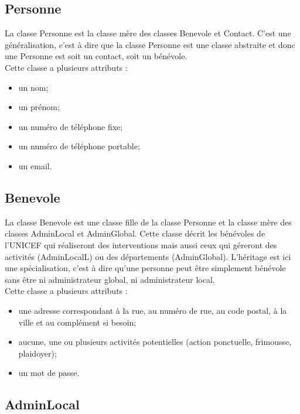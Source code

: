 \documentclass[asi, sansVersion]{picInsa}
\begin{document}
\subsection*{Personne}

La classe Personne est la classe mère des classes Benevole et Contact. C'est une généralisation, c'est à dire que la classe Personne est une classe abstraite et donc une Personne est soit un contact, soit un bénévole. \\
Cette classe a plusieurs attributs : 
\begin{itemize}
\item un nom; %
\item un prénom; %
\item un numéro de téléphone fixe; %
\item un numéro de téléphone portable; %
\item un email. %
\end{itemize}

\subsection*{Benevole}

La classe Benevole est une classe fille de la classe Personne et la classe mère des classes AdminLocal et AdminGlobal. Cette classe décrit les bénévoles de l'UNICEF qui réaliseront des interventions mais aussi ceux qui géreront des activités (AdminLocalL) ou des départements (AdminGlobal). L'héritage est ici une spécialisation, c'est à dire qu'une personne peut être simplement bénévole sans être ni administrateur global, ni administrateur local. \\
Cette classe a plusieurs attributs : 
\begin{itemize}
\item une adresse correspondant à la rue, au numéro de rue, au code postal, à la ville et au complément si besoin; %
\item aucune, une ou plusieurs activités potentielles (action ponctuelle, frimousse, plaidoyer); %
\item un mot de passe. 
\end{itemize}

\subsection*{AdminLocal}
\end{document}
